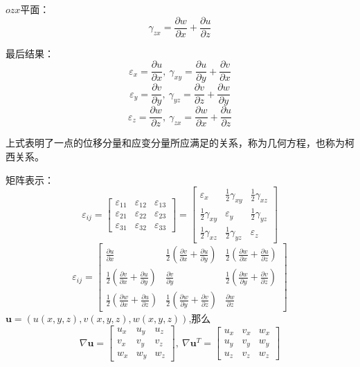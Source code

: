 \documentclass[12pt,a4paper]{article}
\begin{document}
$ozx$平面：
$$
\gamma_{zx}=\frac{\partial w}{\partial x}+\frac{\partial u}{\partial z}
$$

最后结果：
$$
\varepsilon_x=\frac{\partial u}{\partial x}, ~ \gamma_{xy}=\frac{\partial u}{\partial y}+\frac{\partial v}{\partial x}
$$
$$
\varepsilon_y=\frac{\partial v}{\partial y}, ~ \gamma_{yz}=\frac{\partial v}{\partial z}+\frac{\partial w}{\partial y}
$$
$$
\varepsilon_z=\frac{\partial w}{\partial z}, ~ \gamma_{zx}=\frac{\partial w}{\partial x}+\frac{\partial u}{\partial z}
$$

上式表明了一点的位移分量和应变分量所应满足的关系，称为几何方程，也称为柯西关系。

矩阵表示：
$$
\varepsilon_{ij}=
\begin{bmatrix}
\varepsilon_{11} & \varepsilon_{12} & \varepsilon_{13} \\
\varepsilon_{21} & \varepsilon_{22} & \varepsilon_{23} \\
\varepsilon_{31} & \varepsilon_{32} & \varepsilon_{33}
\end{bmatrix}=
\begin{bmatrix}
\varepsilon_{x} & \frac{1}{2}\gamma_{xy} & \frac{1}{2}\gamma_{xz} \\
\frac{1}{2}\gamma_{xy} & \varepsilon_{y} & \frac{1}{2}\gamma_{yz} \\
\frac{1}{2}\gamma_{xz} & \frac{1}{2}\gamma_{yz} & \varepsilon_{z}
\end{bmatrix}
$$
$$
\varepsilon_{ij}=
\begin{bmatrix}
\frac{\partial u}{\partial x} & \frac{1}{2}(\frac{\partial v}{\partial x}+\frac{\partial u}{\partial y}) & \frac{1}{2}(\frac{\partial w}{\partial x}+\frac{\partial u}{\partial z}) \\
\frac{1}{2}(\frac{\partial v}{\partial x}+\frac{\partial u}{\partial y}) & \frac{\partial v}{\partial y} & \frac{1}{2}(\frac{\partial w}{\partial y}+\frac{\partial v}{\partial z}) \\
\frac{1}{2}(\frac{\partial w}{\partial x}+\frac{\partial u}{\partial z}) & \frac{1}{2}(\frac{\partial w}{\partial y}+\frac{\partial v}{\partial z}) & \frac{\partial w}{\partial z}
\end{bmatrix}
$$
$\textbf{u}=(u(x,y,z),v(x,y,z),w(x,y,z))$,那么
$$
\nabla\textbf{u}=\begin{bmatrix}
u_x & u_y & u_z \\
v_x & v_y & v_z \\
w_x & w_y & w_z 
\end{bmatrix},~
\nabla\textbf{u}^T=\begin{bmatrix}
u_x & v_x & w_x \\
u_y & v_y & w_y \\
u_z & v_z & w_z 
\end{bmatrix}
$$
\end{document}
